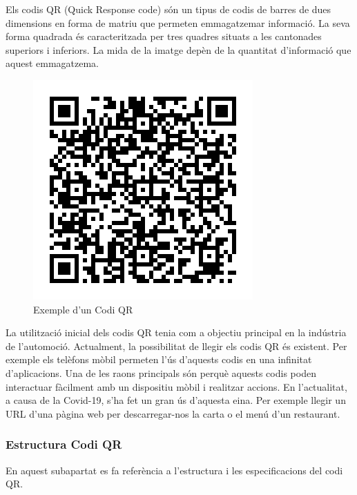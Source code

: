 Els codis QR (Quick Response code) són un tipus de
codis de barres de dues dimensions en forma de matriu que permeten emmagatzemar informació.
La seva forma quadrada és caracteritzada per tres quadres situats a les cantonades superiors
i inferiors. La mida de la imatge depèn de la quantitat d'informació que aquest emmagatzema.

\begin{figure}[H]
    \begin{center}
      \includegraphics[scale=0.50]{Fotos/BenvingutsCodiQR.png}
    \end{center}
    \caption{Exemple d'un Codi QR}
    \label{fig:compiler_phases}
  \end{figure}

La utilització inicial dels codis QR tenia com a objectiu principal en la indústria de l'automoció.
Actualment, la possibilitat de llegir els codis QR és existent. Per exemple els telèfons mòbil permeten l'ús d'aquests
codis en una infinitat d'aplicacions. Una de les raons principals són perquè aquests codis poden interactuar fàcilment amb
un dispositiu mòbil i realitzar accions. En l'actualitat, a causa de la Covid-19, s'ha fet un gran ús d'aquesta eina.
Per exemple llegir un URL d'una pàgina web per descarregar-nos la carta o el menú d'un restaurant.

\subsubsection{Estructura Codi QR}

En aquest subapartat es fa referència a l'estructura i les especificacions del codi QR.


